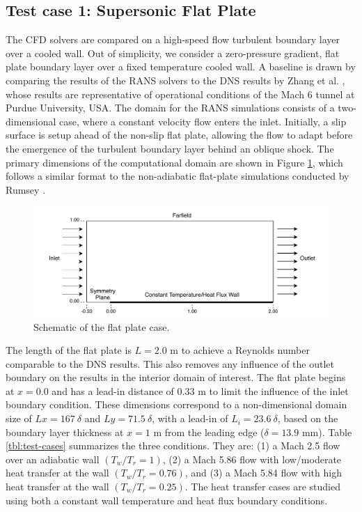 \documentclass[journal ]{new-aiaa}
\begin{document}
\subsection{Test case 1: Supersonic Flat Plate} \label{sec:flatplate}
The CFD solvers are compared on a high-speed flow turbulent boundary layer over a cooled wall. Out of simplicity,  we consider a zero-pressure gradient, flat plate boundary layer over a fixed temperature cooled wall. A baseline is drawn by comparing the results of the RANS solvers to the DNS results by Zhang et al. \cite{Zhang2018DNS}, whose results are representative of operational conditions of the Mach 6 tunnel at Purdue University, USA. The domain for the RANS simulations consists of a two-dimensional case, where a constant velocity flow enters the inlet. Initially, a slip surface is setup ahead of the non-slip flat plate, allowing the flow to adapt before the emergence of the turbulent boundary layer behind an oblique shock. The primary dimensions of the computational domain are shown in Figure \ref{fig:Plate_Domain}, which follows a similar format to the non-adiabatic flat-plate simulations conducted by Rumsey \cite{Rumsey2016NASA}. 


\begin{figure}
\centering
  \includegraphics[width=0.8 \textwidth]{Error/FlatPlate.pdf}
  \caption{Schematic of the flat plate case.}
  \label{fig:Plate_Domain}
\end{figure}

The length of the flat plate is $L = 2.0$ m to achieve a Reynolds number comparable to the DNS results. This also removes any influence of the outlet boundary on the results in the interior domain of interest. The flat plate begins at $x = 0.0$ and has a lead-in distance of $0.33$ m to limit the influence of the inlet boundary condition. These dimensions correspond to a non-dimensional domain size of $Lx = 167~\delta$ and $Ly = 71.5~\delta$, with a lead-in of $L_i = 23.6~\delta$, based on the boundary layer thickness at $x = 1$ m from the leading edge ($\delta = 13.9$ mm). Table \ref{tbl:test-cases} summarizes the three conditions. They are: (1) a Mach 2.5 flow over an adiabatic wall $(T_w/T_r = 1)$, (2) a Mach 5.86 flow with low/moderate heat transfer at the wall $(T_w/T_r = 0.76)$, and (3) a Mach 5.84 flow with high heat transfer at the wall $(T_w/T_r = 0.25)$. The heat transfer cases are studied using both a constant wall temperature and heat flux boundary conditions.
\end{document}
